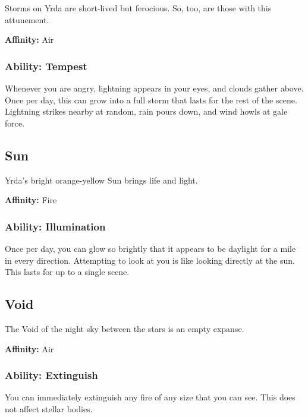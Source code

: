 \begin{multicols}{2}
Storms on Yrda are short-lived but ferocious. So, too, are those
with this attunement.

\textbf{Affinity:} Air

\subsubsection{Ability: Tempest}

Whenever you are angry, lightning appears in your eyes, and clouds
gather above. Once per day, this can grow into a full storm that lasts
for the rest of the scene. Lightning strikes nearby at random, rain pours
down, and wind howls at gale force.

\subsection{Sun}

Yrda's bright orange-yellow Sun brings life and light.

\textbf{Affinity:} Fire

\subsubsection{Ability: Illumination}

Once per day, you can glow so brightly that it appears to be daylight
for a mile in every direction. Attempting to look at you is like looking
directly at the sun. This lasts for up to a single scene.

\subsection{Void}

The Void of the night sky between the stars is an empty expanse.

\textbf{Affinity:} Air

\subsubsection{Ability: Extinguish}

You can immediately extinguish any fire of any size that you can see. This
does not affect stellar bodies.

\end{multicols}
